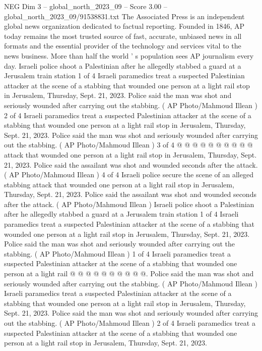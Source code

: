 \begin{textsample}{NEG Dim 3 – global\_north\_2023\_09 – Score 3.00 – global\_north\_2023\_09/91538831.txt}  \label{ex:f3_neg_398}
The Associated Press is an independent global news organization dedicated to factual reporting.
Founded in 1846, AP today remains the most trusted source of fast, accurate, unbiased news in all formats and the essential provider of the technology and services vital to the news business.
More than half the world ' s population sees AP journalism every day.
Israeli police shoot a Palestinian after he allegedly stabbed a guard at a Jerusalem train station 1 of 4 Israeli paramedics treat a suspected Palestinian attacker at the scene of a stabbing that wounded one person at a light rail stop in Jerusalem, Thursday, Sept. 21, 2023.
Police said the man was shot and seriously wounded after carrying out the stabbing. ( AP Photo/Mahmoud Illean ) 2 of 4 Israeli paramedics treat a suspected Palestinian attacker at the scene of a stabbing that wounded one person at a light rail stop in Jerusalem, Thursday, Sept. 21, 2023.
Police said the man was shot and seriously wounded after carrying out the stabbing. ( AP Photo/Mahmoud Illean ) 3 of 4 @ @ @ @ @ @ @ @ @ @ attack that wounded one person at a light rail stop in Jerusalem, Thursday, Sept. 21, 2023.
Police said the assailant was shot and wounded seconds after the attack. ( AP Photo/Mahmoud Illean ) 4 of 4 Israeli police secure the scene of an alleged stabbing attack that wounded one person at a light rail stop in Jerusalem, Thursday, Sept. 21, 2023.
Police said the assailant was shot and wounded seconds after the attack. ( AP Photo/Mahmoud Illean ) Israeli police shoot a Palestinian after he allegedly stabbed a guard at a Jerusalem train station 1 of 4 Israeli paramedics treat a suspected Palestinian attacker at the scene of a stabbing that wounded one person at a light rail stop in Jerusalem, Thursday, Sept. 21, 2023.
Police said the man was shot and seriously wounded after carrying out the stabbing. ( AP Photo/Mahmoud Illean ) 1 of 4 Israeli paramedics treat a suspected Palestinian attacker at the scene of a stabbing that wounded one person at a light rail @ @ @ @ @ @ @ @ @ @.
Police said the man was shot and seriously wounded after carrying out the stabbing. ( AP Photo/Mahmoud Illean ) Israeli paramedics treat a suspected Palestinian attacker at the scene of a stabbing that wounded one person at a light rail stop in Jerusalem, Thursday, Sept. 21, 2023.
Police said the man was shot and seriously wounded after carrying out the stabbing. ( AP Photo/Mahmoud Illean ) 2 of 4 Israeli paramedics treat a suspected Palestinian attacker at the scene of a stabbing that wounded one person at a light rail stop in Jerusalem, Thursday, Sept. 21, 2023.

\end{textsample}
